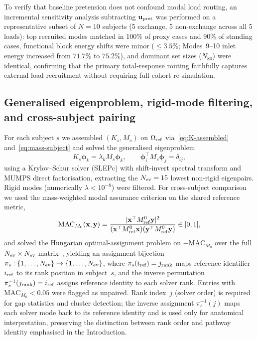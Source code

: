 \documentclass[11pt]{article}
\begin{document}
To verify that baseline pretension does not confound modal load routing, an incremental sensitivity analysis subtracting $\mathbf u_{\rm pret}$ was performed on a representative subset of $N=10$ subjects (5 exchange, 5 non-exchange across all 5 loads): top recruited modes matched in 100\% of proxy cases and 90\% of standing cases, functional block energy shifts were minor ($\le 3.5\%$; Modes~9--10 inlet energy increased from $71.7\%$ to $75.2\%$), and dominant set sizes ($N_{80}$) were identical, confirming that the primary total-response routing faithfully captures external load recruitment without requiring full-cohort re-simulation.

\subsection{Generalised eigenproblem, rigid-mode filtering, and cross-subject pairing}
\label{sec:evp}

For each subject $s$ we assembled $(K_s,M_s)$ on $\Omega_{\rm ref}$ via~\eqref{eq:K-assembled} and~\eqref{eq:mass-subject} and solved the generalised eigenproblem
\begin{equation}
K_s\boldsymbol\phi_k=\lambda_k M_s\boldsymbol\phi_k,\qquad
\boldsymbol\phi_i^\top M_s \boldsymbol\phi_j=\delta_{ij},
\label{eq:gep}
\end{equation}
using a Krylov--Schur solver (SLEPc) with shift-invert spectral transform and MUMPS direct factorisation, extracting the $N_{\rm ev}=15$ lowest non-rigid eigenpairs.
Rigid modes (numerically $\lambda<10^{-8}$) were filtered.
For cross-subject comparison we used the mass-weighted modal assurance criterion on the shared reference metric,
\begin{equation}
\mathrm{MAC}_{M_0}(\mathbf x,\mathbf y)=
\frac{|\mathbf x^\top M_{\rm ref}^{0}\mathbf y|^2}
{(\mathbf x^\top M_{\rm ref}^{0}\mathbf x)(\mathbf y^\top M_{\rm ref}^{0}\mathbf y)}\in[0,1],
\label{eq:mac}
\end{equation}
and solved the Hungarian optimal-assignment problem on $-\mathrm{MAC}_{M_0}$ over the full $N_{\rm ev}\times N_{\rm ev}$ matrix~\citep{Kuhn1955Hungarian}, yielding an assignment bijection $\pi_s: \{1,\dots,N_{\rm ev}\} \to \{1,\dots,N_{\rm ev}\}$, where $\pi_s(i_{\rm ref}) = j_{\rm rank}$ maps reference identifier $i_{\rm ref}$ to its rank position in subject~$s$, and the inverse permutation $\pi_s^{-1}(j_{\rm rank}) = i_{\rm ref}$ assigns reference identity to each solver rank.
Entries with $\mathrm{MAC}_{M_0}<0.05$ were flagged as unpaired.
Rank index~$j$ (solver order) is required for gap statistics and cluster detection; the inverse assignment $\pi_s^{-1}(j)$ maps each solver mode back to its reference identity and is used only for anatomical interpretation, preserving the distinction between rank order and pathway identity emphasised in the Introduction.
\end{document}

